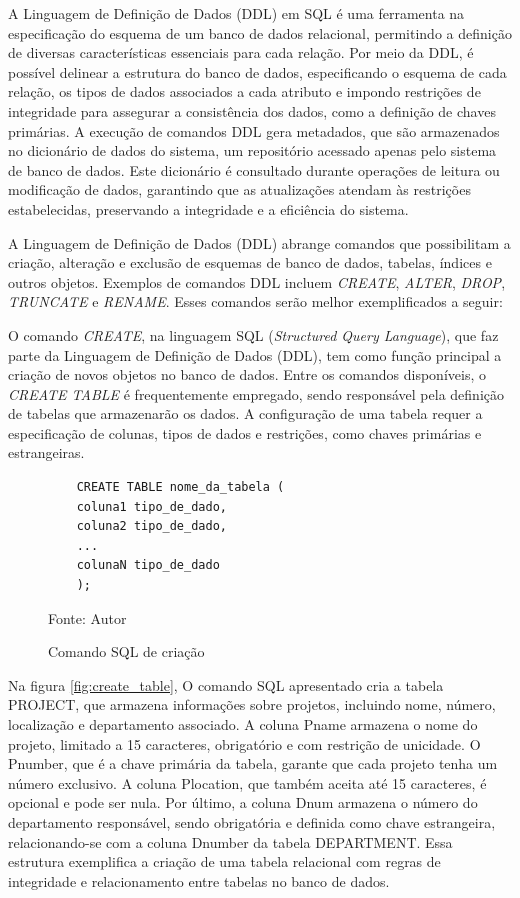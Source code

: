 A Linguagem de Definição de Dados (DDL) em SQL é uma ferramenta na especificação do esquema de um banco de dados relacional, permitindo a definição de diversas características essenciais para cada relação. Por meio da DDL, é possível delinear a estrutura do banco de dados, especificando o esquema de cada relação, os tipos de dados associados a cada atributo e impondo restrições de integridade para assegurar a consistência dos dados, como a definição de chaves primárias. A execução de comandos DDL gera metadados, que são armazenados no dicionário de dados do sistema, um repositório acessado apenas pelo sistema de banco de dados. Este dicionário é consultado durante operações de leitura ou modificação de dados, garantindo que as atualizações atendam às restrições estabelecidas, preservando a integridade e a eficiência do sistema.\cite{silberschatz2011database}

A Linguagem de Definição de Dados (DDL) abrange comandos que possibilitam a criação, alteração e exclusão de esquemas de banco de dados, tabelas, índices e outros objetos. Exemplos de comandos DDL incluem \textit{CREATE}, \textit{ALTER}, \textit{DROP}, \textit{TRUNCATE} e \textit{RENAME}. Esses comandos serão melhor exemplificados a seguir:


O comando \textit{CREATE}, na linguagem SQL (\textit{Structured Query Language}), que faz parte da Linguagem de Definição de Dados (DDL), tem como função principal a criação de novos objetos no banco de dados. Entre os comandos disponíveis, o \textit{CREATE TABLE} é frequentemente empregado, sendo responsável pela definição de tabelas que armazenarão os dados. A configuração de uma tabela requer a especificação de colunas, tipos de dados e restrições, como chaves primárias e estrangeiras\cite{silberschatz2011database}.

\begin{figure}[h!]
    \centering
    \begin{lstlisting}
    CREATE TABLE nome_da_tabela (
    coluna1 tipo_de_dado,
    coluna2 tipo_de_dado,
    ...
    colunaN tipo_de_dado
    );
        \end{lstlisting}
    \caption{Comando SQL de criação}
    Fonte: Autor
    \label{lst:sql_create}
\end{figure}


Na figura \ref{fig:create_table}, O comando SQL apresentado cria a tabela PROJECT, que armazena informações sobre projetos, incluindo nome, número, localização e departamento associado. A coluna Pname armazena o nome do projeto, limitado a 15 caracteres, obrigatório e com restrição de unicidade. O Pnumber, que é a chave primária da tabela, garante que cada projeto tenha um número exclusivo. A coluna Plocation, que também aceita até 15 caracteres, é opcional e pode ser nula. Por último, a coluna Dnum armazena o número do departamento responsável, sendo obrigatória e definida como chave estrangeira, relacionando-se com a coluna Dnumber da tabela DEPARTMENT. Essa estrutura exemplifica a criação de uma tabela relacional com regras de integridade e relacionamento entre tabelas no banco de dados.

